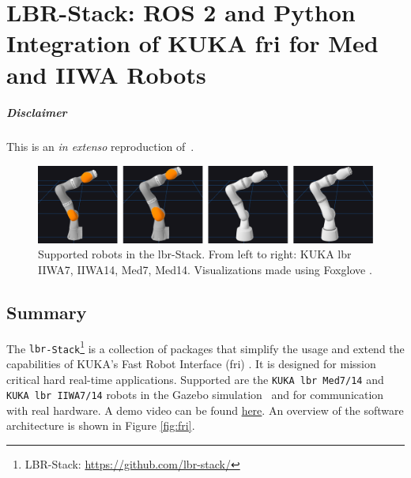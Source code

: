 \chapter[LBR-Stack]{LBR-Stack: ROS 2 and Python Integration of KUKA \gls{fri} for Med and
IIWA Robots}
\label{app:lbr_stack}
\minitoc

\paragraph{Disclaimer} This  is an \textit{in extenso} reproduction of~\cite{huber2023lbr}.

\newpage

\begin{figure}
\centering
\includegraphics[width=\textwidth]{appendix_a/img/joss_figure.png}
\caption[Supported robots in the \gls{lbr}-Stack. From left to right: KUKA \gls{lbr}
IIWA7, IIWA14, Med7, Med14. Visualizations made using Foxglove
.]{Supported robots in the \gls{lbr}-Stack. From left to right: KUKA \gls{lbr}
IIWA7, IIWA14, Med7, Med14. Visualizations made using Foxglove
\footnotemark{}.}
\end{figure}

\hypertarget{summary}{%
\section{Summary}\label{summary}}
The \texttt{\gls{lbr}-Stack}\footnote{LBR-Stack: \url{https://github.com/lbr-stack/}} is a collection of packages that simplify the
usage and extend the capabilities of KUKA's Fast Robot Interface (\gls{fri})
\cite{ref-fri}. It is designed
for mission critical hard real-time applications. Supported are the
\texttt{KUKA\ \gls{lbr}\ Med7/14} and \texttt{KUKA\ \gls{lbr}\ IIWA7/14} robots in
the Gazebo simulation~\cite{ref-gazebo} and for communication with real hardware. A demo video can be
found
\href{https://www.linkedin.com/posts/mhubii_robotics-opensource-ros2-activity-7009974676017848320-S3U5/?utm_source=share\&utm_medium=member_desktop}{here}.
An overview of the software architecture is shown in Figure
\ref{fig:fri}.

